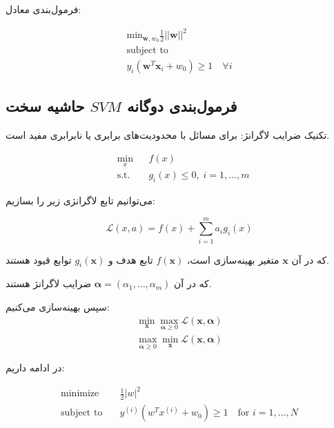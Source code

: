 \documentclass[12pt]{article}
\begin{document}
فرمول‌بندی معادل:
\begin{latin}
    \begin{align*}
  \text{min}_{\mathbf{w},w_0} \frac{1}{2} ||\mathbf{w}||^2 \\
  \text{subject to} \\
  y_i (\mathbf{w}^T \mathbf{x}_i + w_0) \geq 1 \quad \forall i
\end{align*}
\end{latin}

\subsection*{فرمول‌بندی دوگانه $SVM$ حاشیه سخت}
تکنیک ضرایب لاگرانژ: برای مسائل با محدودیت‌های برابری یا نابرابری مفید است.

\begin{latin}
    \[
    \begin{aligned}
        & \underset{x}{\text{min}}
        & & f(x) \\
        & \text{s.t.} 
        & & g_i(x) \leq 0, \; i = 1, ..., m
    \end{aligned}
    \]
\end{latin}
می‌توانیم تابع لاگرانژی زیر را بسازیم:
\begin{latin}
    \[
    \mathcal{L}(x, a) = f(x) + \sum_{i=1}^{m} a_i g_i(x)
    \]
\end{latin}
که در آن $\mathbf{x}$ متغیر بهینه‌سازی است، $f(\mathbf{x})$ تابع هدف و $g_i(\mathbf{x})$ توابع قیود هستند.

که در آن $\boldsymbol{\alpha} = (\alpha_1, \ldots, \alpha_m)$ ضرایب لاگرانژ هستند.

سپس بهینه‌سازی می‌کنیم:
\begin{equation}
    \begin{split}
        \min_{\mathbf{x}} \max_{\boldsymbol{\alpha} \geq 0} \mathcal{L}(\mathbf{x}, \boldsymbol{\alpha})\\
        \max_{\boldsymbol{\alpha} \geq 0} \min_{\mathbf{x}} \mathcal{L}(\mathbf{x}, \boldsymbol{\alpha}) 
    \end{split}
\end{equation}

در ادامه داریم:
\begin{latin}
    \[
    \begin{aligned} 
        \text{minimize} \quad & \frac{1}{2} |w|^2 \\
        \text{subject to} \quad & y^{(i)} (w^T x^{(i)} + w_0) \geq 1 \quad \text{for } i = 1, \ldots, N 
    \end{aligned}
    \]
\end{latin}
\end{document}
